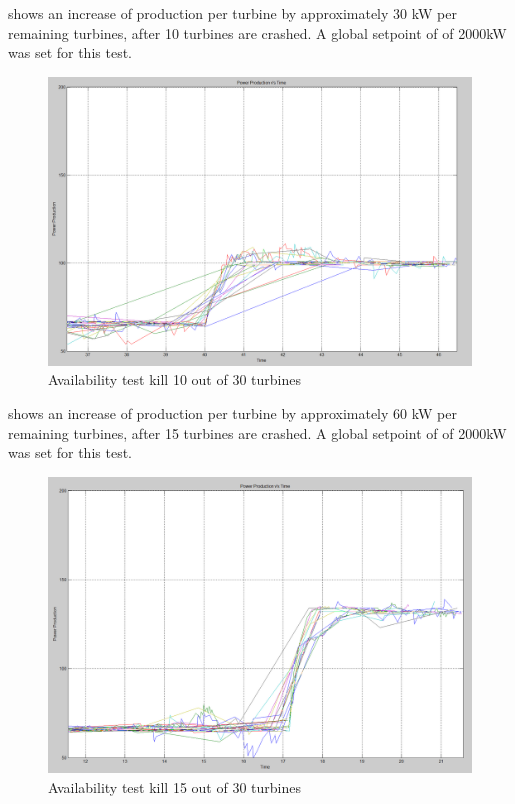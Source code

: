 \FloatBarrier
{} shows an increase of production per turbine by approximately 30 kW per remaining turbines, after 10 turbines are crashed. A global setpoint of of 2000kW was set for this test.

\begin{figure}[!h]
	\centering
	\includegraphics[width=\resultsFigureWidthScale\textwidth]{figures/Results/availabilitytest30-20_setpoint_2000.PNG}
	\caption{Availability test kill 10 out of 30 turbines}
	\label{fig:exp:availability_kill10}
\end{figure}

\FloatBarrier
{} shows an increase of production per turbine by approximately 60 kW per remaining turbines, after 15 turbines are crashed. A global setpoint of of 2000kW was set for this test.

\begin{figure}[!h]
	\centering
	\includegraphics[width=\resultsFigureWidthScale\textwidth]{figures/Results/availabilitytest30-15_setpoint_2000.PNG}
	\caption{Availability test kill 15 out of 30 turbines}
	\label{fig:exp:availability_kill15}
\end{figure}


